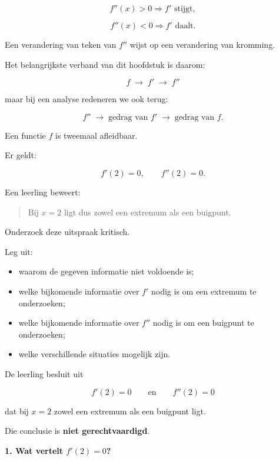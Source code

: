 \documentclass{ximera}
\begin{document}
\[
f''(x)>0
\Rightarrow
f' \text{ stijgt},
\]

\[
f''(x)<0
\Rightarrow
f' \text{ daalt}.
\]

Een verandering van teken van $f''$ wijst op een verandering van
kromming.

Het belangrijkste verband van dit hoofdstuk is daarom:

\[
\boxed{
f
\;\longrightarrow\;
f'
\;\longrightarrow\;
f''
}
\]

maar bij een analyse redeneren we ook terug:

\[
\boxed{
f''
\;\longrightarrow\;
\text{gedrag van }f'
\;\longrightarrow\;
\text{gedrag van }f.
}
\]

\begin{oefening}{\oefG}

  Een functie $f$ is tweemaal afleidbaar.
  
  Er geldt:
  
  \[
  f'(2)=0,
  \qquad
  f''(2)=0.
  \]
  
  Een leerling beweert:
  
  \begin{quote}
  Bij $x=2$ ligt dus zowel een extremum als een buigpunt.
  \end{quote}
  
  Onderzoek deze uitspraak kritisch.
  
  Leg uit:
  \begin{itemize}
    \item waarom de gegeven informatie niet voldoende is;
    \item welke bijkomende informatie over $f'$ nodig is om een extremum
          te onderzoeken;
    \item welke bijkomende informatie over $f''$ nodig is om een buigpunt
          te onderzoeken;
    \item welke verschillende situaties mogelijk zijn.
  \end{itemize}

  \begin{oplossing}

    De leerling besluit uit
    
    \[
    f'(2)=0
    \qquad\text{en}\qquad
    f''(2)=0
    \]
    
    dat bij $x=2$ zowel een extremum als een buigpunt ligt.
    
    Die conclusie is \textbf{niet gerechtvaardigd}.
    
    \textbf{1. Wat vertelt $f'(2)=0$?}
    

\end{oplossing}
\end{oefening}
\end{document}

